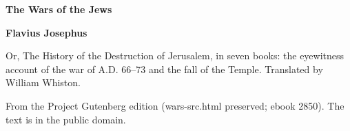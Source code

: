 \documentclass[11pt,letterpaper]{article}
\begin{document}
\color{ink}

\begin{titlepage}
\centering
\vspace*{4em}
{\LARGE\bfseries\color{heading} The Wars of the Jews\par}
\vspace{2em}
{\Large\bfseries\color{heading} Flavius Josephus\par}
\vspace{2.5em}
{\itshape\color{subhead}\parbox{0.8\linewidth}{\centering Or, The History of the Destruction of Jerusalem, in seven books: the eyewitness account of the war of A.D. 66--73 and the fall of the Temple. Translated by William Whiston.\par}}
\vfill
{\small From the Project Gutenberg edition (wars-src.html preserved; ebook 2850). The text is in the public domain.\par}
\vspace{2em}
\end{titlepage}

\tableofcontents


\end{document}
